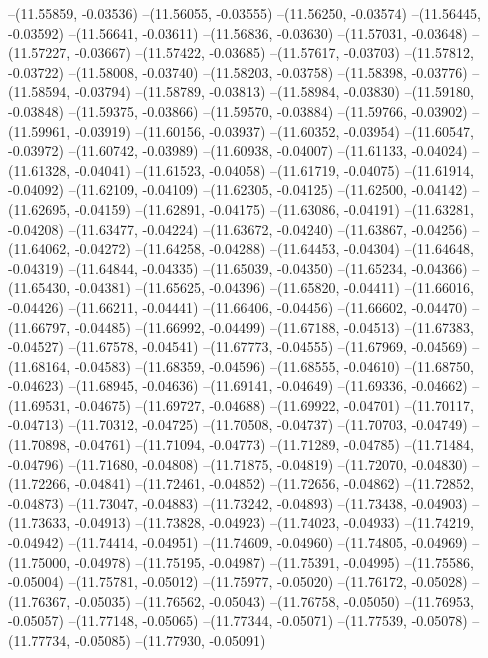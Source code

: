 --(11.55859, -0.03536)
--(11.56055, -0.03555)
--(11.56250, -0.03574)
--(11.56445, -0.03592)
--(11.56641, -0.03611)
--(11.56836, -0.03630)
--(11.57031, -0.03648)
--(11.57227, -0.03667)
--(11.57422, -0.03685)
--(11.57617, -0.03703)
--(11.57812, -0.03722)
--(11.58008, -0.03740)
--(11.58203, -0.03758)
--(11.58398, -0.03776)
--(11.58594, -0.03794)
--(11.58789, -0.03813)
--(11.58984, -0.03830)
--(11.59180, -0.03848)
--(11.59375, -0.03866)
--(11.59570, -0.03884)
--(11.59766, -0.03902)
--(11.59961, -0.03919)
--(11.60156, -0.03937)
--(11.60352, -0.03954)
--(11.60547, -0.03972)
--(11.60742, -0.03989)
--(11.60938, -0.04007)
--(11.61133, -0.04024)
--(11.61328, -0.04041)
--(11.61523, -0.04058)
--(11.61719, -0.04075)
--(11.61914, -0.04092)
--(11.62109, -0.04109)
--(11.62305, -0.04125)
--(11.62500, -0.04142)
--(11.62695, -0.04159)
--(11.62891, -0.04175)
--(11.63086, -0.04191)
--(11.63281, -0.04208)
--(11.63477, -0.04224)
--(11.63672, -0.04240)
--(11.63867, -0.04256)
--(11.64062, -0.04272)
--(11.64258, -0.04288)
--(11.64453, -0.04304)
--(11.64648, -0.04319)
--(11.64844, -0.04335)
--(11.65039, -0.04350)
--(11.65234, -0.04366)
--(11.65430, -0.04381)
--(11.65625, -0.04396)
--(11.65820, -0.04411)
--(11.66016, -0.04426)
--(11.66211, -0.04441)
--(11.66406, -0.04456)
--(11.66602, -0.04470)
--(11.66797, -0.04485)
--(11.66992, -0.04499)
--(11.67188, -0.04513)
--(11.67383, -0.04527)
--(11.67578, -0.04541)
--(11.67773, -0.04555)
--(11.67969, -0.04569)
--(11.68164, -0.04583)
--(11.68359, -0.04596)
--(11.68555, -0.04610)
--(11.68750, -0.04623)
--(11.68945, -0.04636)
--(11.69141, -0.04649)
--(11.69336, -0.04662)
--(11.69531, -0.04675)
--(11.69727, -0.04688)
--(11.69922, -0.04701)
--(11.70117, -0.04713)
--(11.70312, -0.04725)
--(11.70508, -0.04737)
--(11.70703, -0.04749)
--(11.70898, -0.04761)
--(11.71094, -0.04773)
--(11.71289, -0.04785)
--(11.71484, -0.04796)
--(11.71680, -0.04808)
--(11.71875, -0.04819)
--(11.72070, -0.04830)
--(11.72266, -0.04841)
--(11.72461, -0.04852)
--(11.72656, -0.04862)
--(11.72852, -0.04873)
--(11.73047, -0.04883)
--(11.73242, -0.04893)
--(11.73438, -0.04903)
--(11.73633, -0.04913)
--(11.73828, -0.04923)
--(11.74023, -0.04933)
--(11.74219, -0.04942)
--(11.74414, -0.04951)
--(11.74609, -0.04960)
--(11.74805, -0.04969)
--(11.75000, -0.04978)
--(11.75195, -0.04987)
--(11.75391, -0.04995)
--(11.75586, -0.05004)
--(11.75781, -0.05012)
--(11.75977, -0.05020)
--(11.76172, -0.05028)
--(11.76367, -0.05035)
--(11.76562, -0.05043)
--(11.76758, -0.05050)
--(11.76953, -0.05057)
--(11.77148, -0.05065)
--(11.77344, -0.05071)
--(11.77539, -0.05078)
--(11.77734, -0.05085)
--(11.77930, -0.05091)
